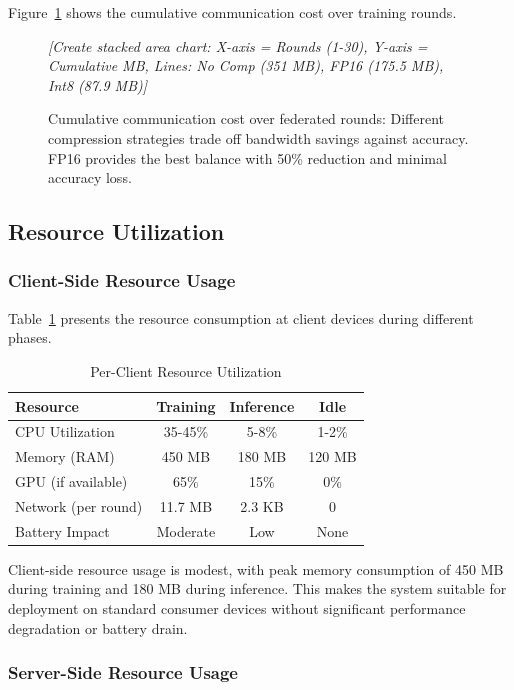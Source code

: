 Figure~\ref{fig:communication} shows the cumulative communication cost over training rounds.

\begin{figure}[h]
\centering
\textit{[Create stacked area chart: X-axis = Rounds (1-30), Y-axis = Cumulative MB, Lines: No Comp (351 MB), FP16 (175.5 MB), Int8 (87.9 MB)]}
\caption{Cumulative communication cost over federated rounds: Different compression strategies trade off bandwidth savings against accuracy. FP16 provides the best balance with 50\% reduction and minimal accuracy loss.}
\label{fig:communication}
\end{figure}

\subsection{Resource Utilization}
\label{subsec:resource}

\subsubsection{Client-Side Resource Usage}

Table~\ref{tab:client_resources} presents the resource consumption at client devices during different phases.

\begin{table}[h]
\centering
\caption{Per-Client Resource Utilization}
\label{tab:client_resources}
\begin{tabular}{lccc}
\toprule
\textbf{Resource} & \textbf{Training} & \textbf{Inference} & \textbf{Idle} \\
\midrule
CPU Utilization & 35-45\% & 5-8\% & 1-2\% \\
Memory (RAM) & 450 MB & 180 MB & 120 MB \\
GPU (if available) & 65\% & 15\% & 0\% \\
Network (per round) & 11.7 MB & 2.3 KB & 0 \\
Battery Impact & Moderate & Low & None \\
\bottomrule
\end{tabular}
\end{table}

Client-side resource usage is modest, with peak memory consumption of 450 MB during training and 180 MB during inference. This makes the system suitable for deployment on standard consumer devices without significant performance degradation or battery drain.

\subsubsection{Server-Side Resource Usage}

